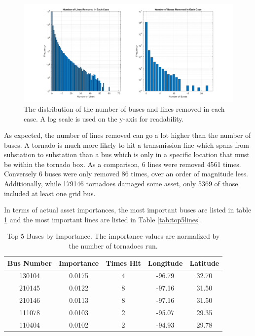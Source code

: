 \documentclass[12pt]{article}
\begin{document}
\begin{figure}[H]
    \centering %
    \includegraphics[width=\textwidth]{Assettypesremovedincases.png}
    \caption[Distribution of buses and lines removed in each case]{The distribution of the number of buses and lines removed in each case. A log scale is used on the y-axis for readability.}
    \label{fig:Assettypesremovedincases}
\end{figure}

As expected, the number of lines removed can go a lot higher than the number of buses. A tornado is much more likely to hit a transmission line which spans from substation to substation than a bus which is only in a specific location that must be within the tornado box. As a comparison, 6 lines were removed 4561 times. Conversely 6 buses were only removed 86 times, over an order of magnitude less. Additionally, while 179146 tornadoes damaged some asset, only 5369 of those included at least one grid bus. \par

In terms of actual asset importances, the most important buses are listed in table \ref{tab:top5buses} and the most important lines are listed in Table \ref{tab:top5lines}.

\begin{table}[ht]
    \centering
    \begin{tabular}{ccccc}
        \toprule
        Bus Number & Importance & Times Hit & Longitude & Latitude \\
        \midrule
        130104 & 0.0175 & 4 & -96.79 & 32.70 \\
        210145 & 0.0122 & 8 & -97.16 & 31.50 \\
        210146 & 0.0113 & 8 & -97.16 & 31.50 \\
        111078 & 0.0103 & 2 & -95.07 & 29.35 \\
        110404 & 0.0102 & 2 & -94.93 & 29.78 \\
        \bottomrule
    \end{tabular}
    \caption[Top 5 Buses by Importance]{Top 5 Buses by Importance. The importance values are normalized by the number of tornadoes run.}
    \label{tab:top5buses}
\end{table}
\end{document}

